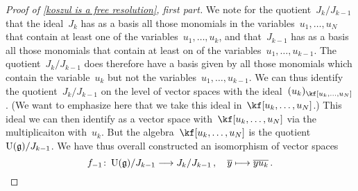\begin{proof}[Proof of \cref{koszul is a free resolution}, first part]
	We note for the quotient~$J_k / J_{k-1}$ that the ideal~$J_k$ has as a basis all those monomials in the variables~$u_1, \dotsc, u_N$ that contain at least one of the variables~$u_1, \dotsc, u_k$, and that~$J_{k-1}$ has as a basis all those monomials that contain at least on of the variables~$u_1, \dotsc, u_{k-1}$.
	The quotient~$J_k / J_{k-1}$ does therefore have a basis given by all those monomials which contain the variable~$u_k$ but not the variables~$u_1, \dotsc, u_{k-1}$.
	We can thus identify the quotient~$J_k / J_{k-1}$ on the level of vector spaces with the ideal~$\ideal{u_k}_{\kf[u_k, \dotsc, u_N]}$.
	(We want to emphasize here that we take this ideal in~$\kf[u_k, \dotsc, u_N]$.)
	This ideal we can then identify as a vector space with~$\kf[u_k, \dotsc, u_N]$ via the multiplicaiton with~$u_k$.
	But the algebra~$\kf[u_k, \dotsc, u_N]$ is the quotient~$\operatorname{U}(\mathfrak{g}) / J_{k-1}$.
	We have thus overall constructed an isomorphism of vector spaces
	\[
		f_{-1}
		\colon
		\Univ(\glie) / J_{k-1}
		\to
		J_k / J_{k-1} \,,
		\quad
		\class{y}
		\mapsto
		\class{y u_k} \,.
	\]


\end{proof}
